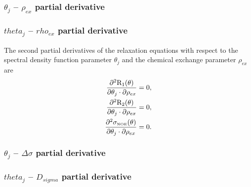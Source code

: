 \begin{latexonly}
    \subsubsection{$\theta_j$ -- $\rho_{ex}$ partial derivative}
\end{latexonly}
\begin{htmlonly}
    \subsubsection{$theta_j$ -- $rho_{ex}$ partial derivative}
\end{htmlonly}

The second partial derivatives of the relaxation equations with respect to the spectral density function parameter $\theta_j$ and the chemical exchange parameter $\rho_{ex}$ are
\begin{subequations}
\begin{align}
    \frac{\partial^2 \mathrm{R}_1(\theta)}{\partial \theta_j \cdot \partial \rho_{ex}} &= 0,        \label{eq: Ri': d2R1/dmfj.dRex} \\
    \frac{\partial^2 \mathrm{R}_2(\theta)}{\partial \theta_j \cdot \partial \rho_{ex}} &= 0,        \label{eq: Ri': d2R2/dmfj.dRex} \\
    \frac{\partial^2 \sigma_{\scriptscriptstyle \mathrm{NOE}}(\theta)}{\partial \theta_j \cdot \partial \rho_{ex}} &= 0. \label{eq: Ri': d2sigmaNOE/dmfj.dRex}
\end{align}
\end{subequations}


\begin{latexonly}
    \subsubsection{$\theta_j$ -- $\Delta\sigma$ partial derivative}
\end{latexonly}
\begin{htmlonly}
    \subsubsection{$theta_j$ -- $D_{sigma}$ partial derivative}
\end{htmlonly}

